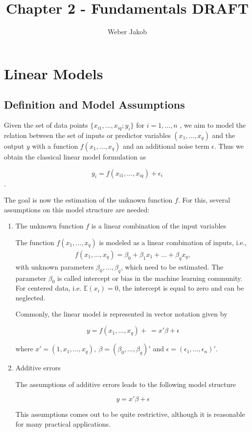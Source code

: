 \documentclass[10pt,a4paper]{article}
\title{Chapter 2 - Fundamentals DRAFT}
\author{Weber Jakob}
\begin{document}
\maketitle

\section{Linear Models} \label{SectionLinModel}
	
\subsection{Definition and Model Assumptions}  \label{SubsectionLinModelDefAndAssump}

Given the set of data points $\{x_{i1}, ..., x_{iq}; y_i \}$ for $i = 1, ..., n$ , we aim to model the relation between the set of inputs or predictor variables $(x_1, ..., x_q)$ and the output $y$ with a function $f(x_1, ..., x_q)$ and an additional noise term $\epsilon$. Thus we obtain the classical linear model formulation as

\begin{equation}
	y_i = f(x_{i1}, ..., x_{iq}) + \epsilon_i
\end{equation}.

The goal is now the estimation of the unknown function $f$. For this, several assumptions on this model structure are needed:

\begin{enumerate}
	\item The unknown function $f$ is a linear combination of the input variables
	
	The function $f(x_1, ..., x_q)$ is modeled as a linear combination of inputs, i.e.,
	\begin{align} \label{linCombOfInputs}
		f(x_1, ..., x_q) = \beta_0 + \beta_1 x_1 + ... + \beta_q x_q,
	\end{align}
	with unknown parameters $\beta_0, ..., \beta_q$, which need to be estimated. The parameter $\beta_0$ is called intercept or bias in the machine learning community. For centered data, i.e. $\mathbb{E}(x_i) = 0$, the intercept is equal to zero and can be neglected.
	
	Commonly, the linear model is represented in vector notation  given by
	
	$$ y = f(x_1, ..., x_q) + \ = x' \beta + \epsilon $$
	
	where $x' = (1, x_1, \dots, x_q), \ \beta = (\beta_0, \dots, \beta_q)'$ and $\epsilon = (\epsilon_1, \dots, \epsilon_n)'$.
	
	\item Additive errors
	
	The assumptions of additive errors leads to the following model structure
	
	$$y = x'\beta + \epsilon$$
	
	This assumptions comes out to be quite restrictive, although it is reasonable for many practical applications.
\end{enumerate}
\end{document}
